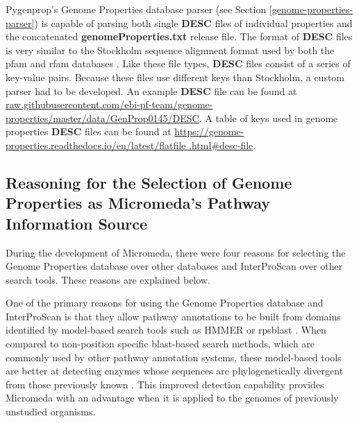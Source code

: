 Pygenprop's Genome Properties database parser (see Section 
\ref{genome-properties-parser}) is capable of parsing both single \textbf{DESC} 
files of individual properties and the concatenated 
\textbf{genomeProperties.txt} release file. The format of \textbf{DESC} files is 
very similar to the Stockholm sequence alignment format used by both the 
\gls{pfam} and \gls{rfam} databases \cite{bateman2004pfam, griffiths2003rfam}. Like 
these file types, \textbf{DESC} files consist of a series of key-value pairs. 
Because these files use different keys than Stockholm, a custom parser had to be 
developed. An example \textbf{DESC} file can be found at 
\href{http://raw.githubusercontent.com/ebi-pf-team/genome-properties/master/data/GenProp0145/DESC}{raw.githubusercontent.com/ebi-pf-team/genome-properties/master/data/GenProp0145/DESC}. 
A table of keys used in  genome properties \textbf{DESC} files can be found at 
\href{https://genome-properties.readthedocs.io/en/latest/flatfile.html#desc-file}{https://genome-properties.readthedocs.io/en/latest/flatfile .html\#desc-file}.

\subsection{Reasoning for the Selection of Genome Properties as Micromeda's 
Pathway Information Source} \label{reason-for-genome-properties-selection}

During the development of Micromeda, there were four reasons for selecting the 
Genome Properties database over other databases and InterProScan over other 
search tools. These reasons are explained below.

One of the primary reasons for using the Genome Properties database and 
InterProScan is that they allow pathway annotations to be built from domains 
identified by model-based search tools such as HMMER \cite{eddy2011accelerated} 
or \gls{rpsblast} \cite{mcginnis2004blast}. When compared to non-position
specific \gls{blast}-based \cite{altschul1990basic} search methods, which are 
commonly used by other pathway annotation systems, these model-based tools are 
better at detecting enzymes whose sequences are phylogenetically divergent from 
those previously known \cite{eddy2011accelerated}. This improved detection 
capability provides Micromeda with an advantage when it is applied to the 
genomes of previously unstudied organisms.

